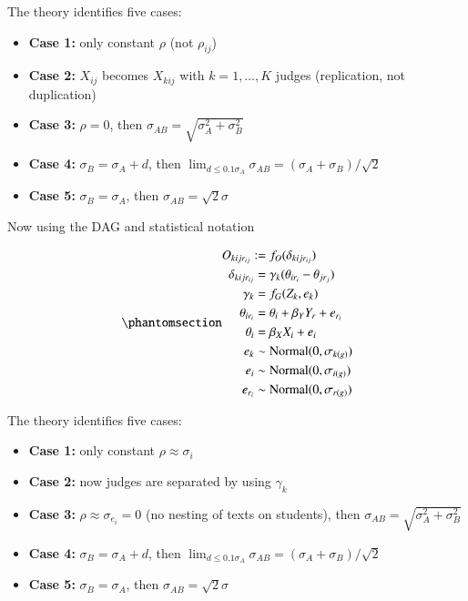 \documentclass[
  authoryear,
  preprint,
  1p]{elsarticle}
\providecommand{\tightlist}{%
  \setlength{\itemsep}{0pt}\setlength{\parskip}{0pt}}\usepackage{longtable,booktabs,array}
\begin{document}
The theory identifies five cases:

\begin{itemize}
\tightlist
\item
  \textbf{Case 1:} only constant \(\rho\) (not \(\rho_{ij}\))
\item
  \textbf{Case 2:} \(X_{ij}\) becomes \(X_{kij}\) with \(k=1, \dots, K\)
  judges (replication, not duplication)
\item
  \textbf{Case 3:} \(\rho = 0\), then
  \(\sigma_{AB} = \sqrt{ \sigma^{2}_{A} + \sigma^{2}_{B}}\)
\item
  \textbf{Case 4:} \(\sigma_{B}=\sigma_{A}+d\), then
  \(\lim_{d \leq 0.1\sigma_{A}} \sigma_{AB} = (\sigma_{A} + \sigma_{B}) /\sqrt{2}\)
\item
  \textbf{Case 5:} \(\sigma_{B}=\sigma_{A}\), then
  \(\sigma_{AB} = \sqrt{2}\sigma\)
\end{itemize}

Now using the DAG and statistical notation

\begin{equation}\phantomsection\label{eq-StatModel_thurstone}{
\begin{aligned}
  O_{kijr_{ij}} := & \; f_{O}( \delta_{kijr_{ij}} ) \\
  \delta_{kijr_{ij}} = & \; \gamma_{k}( \theta_{ir_{i}} - \theta_{jr_{j}} ) \\
  \gamma_{k} = & \; f_{G}( Z_{k}, e_{k} ) \\
  \theta_{ir_{i}} = & \; \theta_{i} + \beta_{Y} Y_{r} + e_{r_{i}}  \\
  \theta_{i} = & \; \beta_{X} X_{i} + e_{i}  \\
  e_{k} \sim & \; \text{Normal}(0, \sigma_{k(g)}) \\
  e_{i} \sim & \; \text{Normal}(0, \sigma_{i(g)}) \\
  e_{r_{i}} \sim & \; \text{Normal}(0, \sigma_{r(g)})
\end{aligned}
}\end{equation}

The theory identifies five cases:

\begin{itemize}
\tightlist
\item
  \textbf{Case 1:} only constant \(\rho \approx \sigma_{i}\)
\item
  \textbf{Case 2:} now judges are separated by using \(\gamma_{k}\)
\item
  \textbf{Case 3:} \(\rho \approx \sigma_{e_{i}} = 0\) (no nesting of
  texts on students), then
  \(\sigma_{AB} = \sqrt{ \sigma^{2}_{A} + \sigma^{2}_{B}}\)
\item
  \textbf{Case 4:} \(\sigma_{B}=\sigma_{A}+d\), then
  \(\lim_{d \leq 0.1\sigma_{A}} \sigma_{AB} = (\sigma_{A} + \sigma_{B}) /\sqrt{2}\)
\item
  \textbf{Case 5:} \(\sigma_{B}=\sigma_{A}\), then
  \(\sigma_{AB} = \sqrt{2}\sigma\)
\end{itemize}
\end{document}
